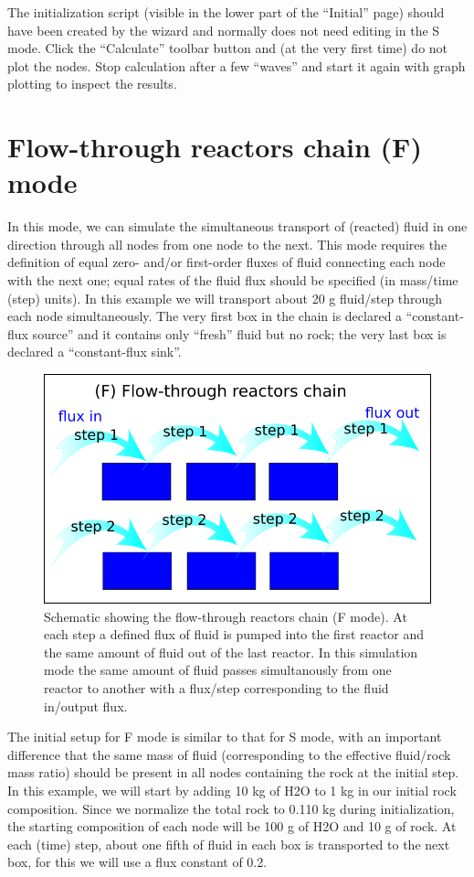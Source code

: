 \documentclass[
]{book}
\begin{document}
The initialization script (visible in the lower part of the ``Initial'' page) should have been created by the wizard and normally does not need editing in the S mode. Click the ``Calculate'' toolbar button and (at the very first time) do not plot the nodes. Stop calculation after a few ``waves'' and start it again with graph plotting to inspect the results.

\hypertarget{flow-through-reactors-chain-f-mode}{%
\section{Flow-through reactors chain (F) mode}\label{flow-through-reactors-chain-f-mode}}

In this mode, we can simulate the simultaneous transport of (reacted) fluid in one direction through all nodes from one node to the next. This mode requires the definition of equal zero- and/or first-order fluxes of fluid connecting each node with the next one; equal rates of the fluid flux should be specified (in mass/time (step) units). In this example we will transport about 20 g fluid/step through each node simultaneously. The very first box in the chain is declared a ``constant-flux source'' and it contains only ``fresh'' fluid but no rock; the very last box is declared a ``constant-flux sink''.

\begin{figure}
\includegraphics[width=0.7\linewidth]{figures/module5/fig-2} \caption{Schematic showing the flow-through reactors chain (F mode). At each step a defined flux of fluid is pumped into the first reactor and the same amount of fluid out of the last reactor. In this simulation mode the same amount of fluid passes simultanously from one reactor to another with a flux/step corresponding to the fluid in/output flux.}\label{fig:fig-2e}
\end{figure}

The initial setup for F mode is similar to that for S mode, with an important difference that the same mass of fluid (corresponding to the effective fluid/rock mass ratio) should be present in all nodes containing the rock at the initial step. In this example, we will start by adding 10 kg of H2O to 1 kg in our initial rock composition. Since we normalize the total rock to 0.110 kg during initialization, the starting composition of each node will be 100 g of H2O and 10 g of rock. At each (time) step, about one fifth of fluid in each box is transported to the next box, for this we will use a flux constant of 0.2.
\end{document}
